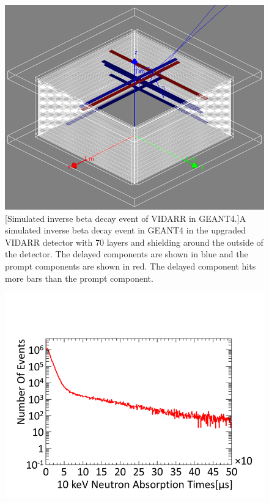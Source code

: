 \begin{figure}[!h]
\centering
\begin{minipage}{.45\textwidth}
  \centering
  \includegraphics[width=\linewidth]{Chapter4/Figs/simulatedIbdG4.png}
  [Simulated inverse beta decay event of VIDARR in GEANT4.]{A simulated inverse beta decay event in GEANT4 in the upgraded VIDARR detector with 70 layers and shielding around the outside of the detector. The delayed components are shown in blue and the prompt components are shown in red. The delayed component hits more bars than the prompt component.} 
  \label{fig:simultaedIbdEvent}
  \vspace{0.478cm} %
\end{minipage}%
\qquad
\begin{minipage}{.45\textwidth}
  \centering
  \includegraphics[width=\linewidth]{Chapter4/Figs/neutron10KeVAbsoptionTimesMedText.png} 

\end{minipage}
\end{figure}
